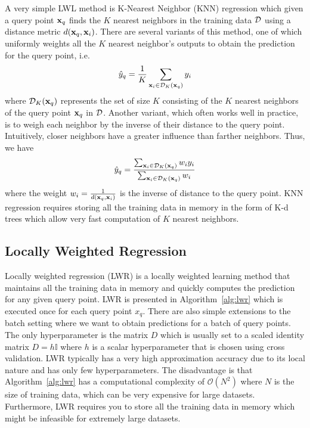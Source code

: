 A very simple LWL method is K-Nearest Neighbor (KNN) regression which
given a query point $\mathbf{x}_q$ finds the $K$ nearest neighbors in the
training data $\mathcal{D}$ using a distance metric $d(\mathbf{x}_q,
\mathbf{x}_i)$. There are several variants of this method, one of which
uniformly weights all the $K$ nearest neighbor's outputs to obtain the
prediction for the query point, i.e.
\begin{equation}
  \label{eq:14}
  \hat{y}_q = \frac{1}{K} \sum_{\mathbf{x}_i \in \mathcal{D}_K(\mathbf{x}_q)} y_i
\end{equation}
where $\mathcal{D}_K(\mathbf{x}_q)$ represents the set of size $K$ consisting
of the $K$ nearest neighbors of the query point $\mathbf{x}_q$ in
$\mathcal{D}$. Another variant, which often works well in practice, is to
weigh each neighbor by the inverse of their distance to the query
point. Intuitively, closer neighbors have a greater influence than
farther neighbors. Thus, we have
\begin{equation}
  \label{eq:15}
  \hat{y}_q = \frac{\sum_{\mathbf{x}_i \in \mathcal{D}_K(\mathbf{x}_q)} w_iy_i}{\sum_{\mathbf{x}_i \in \mathcal{D}_K(\mathbf{x}_q)} w_i}
\end{equation}
where the weight $w_i = \frac{1}{d(\mathbf{x}_q, \mathbf{x}_i)}$ is the
inverse of distance to the query point. KNN regression requires
storing all the training data in memory in the form of K-d trees which
allow very fast computation of $K$ nearest neighbors.

\subsection{Locally Weighted Regression}
\label{sec:locally-weight-regr}

Locally weighted regression (LWR) is a locally weighted learning
method that maintains all the training data in memory and quickly
computes the prediction for any given query point. LWR is presented in
Algorithm~\ref{alg:lwr} which is executed once for each query point
$x_q$. There are also simple extensions to the batch setting where we
want to obtain predictions for a batch of query points. The only
hyperparameter is the matrix $D$ which is usually set to a scaled
identity matrix $D = h\mathbb{I}$ where $h$ is a scalar hyperparameter
that is chosen using cross validation. LWR typically has a very high
approximation accuracy due to its local nature and has only few
hyperparameters. The disadvantage is that Algorithm~\ref{alg:lwr} has
a computational complexity of $\mathcal{O}(N^2)$ where $N$ is the size
of training data, which can be very expensive for large
datasets. Furthermore, LWR requires you to store all the training data
in memory which might be infeasible for extremely large datasets.

